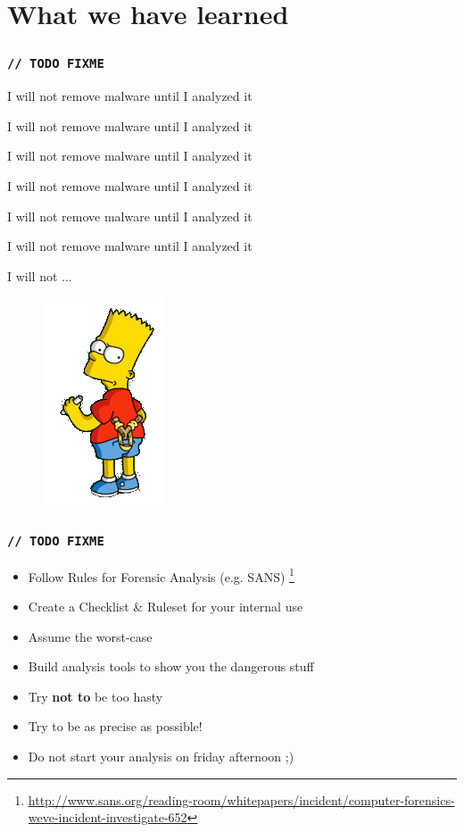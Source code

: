 \documentclass[12pt,a4paper]{beamer}
\begin{document}
\section{What we have learned}


{

\begin{frame}
\frametitle{\texttt{// TODO FIXME}}

\begin{itemize}
{\color{white}
	\item[] I will not remove malware until I analyzed it
	\item[] I will not remove malware until I analyzed it
	\item[] I will not remove malware until I analyzed it
	\item[] I will not remove malware until I analyzed it
	\item[] I will not remove malware until I analyzed it
	\item[] I will not remove malware until I analyzed it
	\item[] I will not ...
}
\end{itemize}

\begin{figure}
\hfill\includegraphics[scale=0.4]{images/bart.png}

\end{figure}

\end{frame}
}



\begin{frame}
\frametitle{\texttt{// TODO FIXME}}
\begin{itemize}
	\item Follow Rules for Forensic Analysis (e.g. SANS) \footnote{\url{http://www.sans.org/reading-room/whitepapers/incident/computer-forensics-weve-incident-investigate-652}}
	\item Create a Checklist \& Ruleset for your internal use
	\item Assume the worst-case
	\item Build analysis tools to show you the dangerous stuff
	\item Try \textbf{not to} be too hasty
	\item Try to be as precise as possible!
	\item Do not start your analysis on friday afternoon ;)
\end{itemize}
\end{frame}
\end{document}
